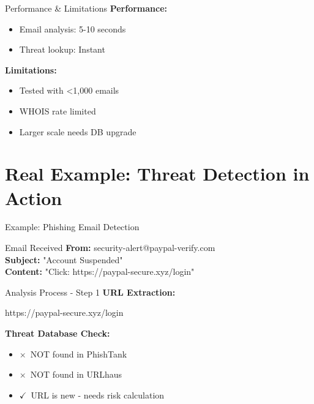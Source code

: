 \documentclass[aspectratio=169]{beamer}
\newcommand{\cmark}{\textcolor{lowgreen}{$\checkmark$}}
\newcommand{\xmark}{\textcolor{criticalred}{$\times$}}
\begin{document}
\begin{frame}{Performance \& Limitations}
\small
\textbf{Performance:}
\begin{itemize}
    \item Email analysis: 5-10 seconds
    \item Threat lookup: Instant
\end{itemize}

\vspace{0.2cm}
\textbf{Limitations:}
\begin{itemize}
    \item Tested with <1,000 emails
    \item WHOIS rate limited
    \item Larger scale needs DB upgrade
\end{itemize}
\end{frame}

\section{Real Example: Threat Detection in Action}

\begin{frame}{Example: Phishing Email Detection}
\begin{block}{Email Received}
\textbf{From:} security-alert@paypal-verify.com\\
\textbf{Subject:} "Account Suspended"\\
\textbf{Content:} "Click: https://paypal-secure.xyz/login"
\end{block}
\end{frame}

\begin{frame}{Analysis Process - Step 1}
\textbf{URL Extraction:}

https://paypal-secure.xyz/login

\vspace{0.3cm}
\textbf{Threat Database Check:}
\begin{itemize}
    \item \xmark\ NOT found in PhishTank
    \item \xmark\ NOT found in URLhaus
    \item \cmark\ URL is new - needs risk calculation
\end{itemize}
\end{frame}
\end{document}
